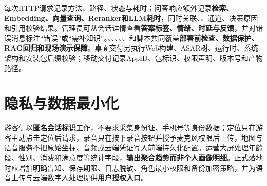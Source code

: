 每次HTTP请求记录方法、路径、状态与耗时；问答响应额外记录\textbf{检索、Embedding、向量查询、Reranker和LLM耗时}，同时关联、、通道、决策原因和引用校验结果。管理员可从会话详情查看\textbf{答案标签、情绪、时延与反馈}，并对错误消息标注“错误”或“需补知识”。、、、、、和脚本共同覆盖\textbf{部署前检查、数据保护、RAG回归和现场演示保障}。桌面交付另执行Web构建、ASAR树、运行时、系统架构和安装包后缀校验；移动交付记录AppID、包标识、权限声明、版本号和产物路径。

\section{隐私与数据最小化}

游客侧以\textbf{匿名会话标识}工作，不要求采集身份证、手机号等身份数据；定位只在游客主动点击定位后请求，录音只在按下录音按钮并授予麦克风权限后上传，地图与语音服务不把原始坐标、音频或云端凭证写入前端持久化配置。运营大屏处理年龄段、性别、消费和满意度等统计字段，\textbf{输出聚合趋势而非个人画像明细}。正式落地时应增加明确告知、保存期限、日志脱敏、角色最小权限和备份加密策略，并为语音上传与云端数字人处理提供\textbf{用户授权入口}。
